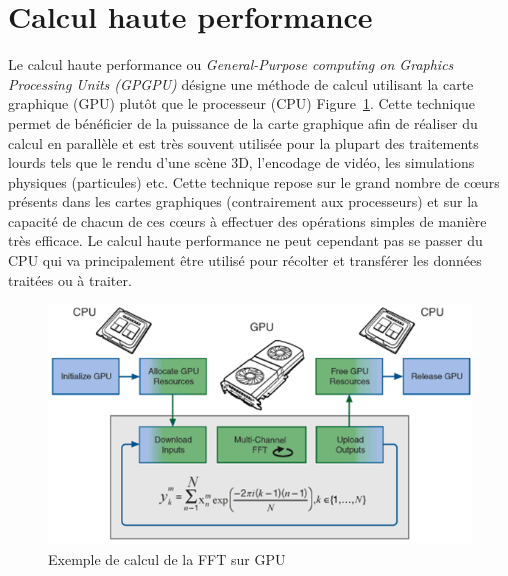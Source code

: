 \section{Calcul haute performance}
Le calcul haute performance\cite{sanders2010cuda} ou \emph{General-Purpose computing on Graphics Processing Units (GPGPU)} désigne une méthode de calcul utilisant la carte graphique (GPU) plutôt que le processeur (CPU) Figure~\ref{fig:gpgpu}. Cette technique permet de bénéficier de la puissance de la carte graphique afin de réaliser du calcul en parallèle et est très souvent utilisée pour la plupart des traitements lourds tels que le rendu d'une scène 3D, l'encodage de vidéo, les simulations physiques (particules) etc. Cette technique repose sur le grand nombre de cœurs présents dans les cartes graphiques (contrairement aux processeurs) et sur la capacité de chacun de ces cœurs à effectuer des opérations simples de manière très efficace. Le calcul haute performance ne peut cependant pas se passer du CPU qui va principalement être utilisé pour récolter et transférer les données traitées ou à traiter.

\begin{figure}[H]
\centering
\includegraphics[scale=0.7]{images/gpuworkflow}
\caption{Exemple de calcul de la FFT sur GPU\protect\footnotemark}
\label{fig:gpgpu}
\end{figure}
